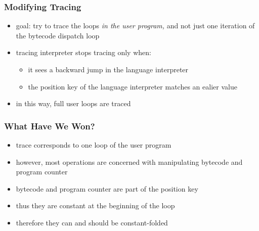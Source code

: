 \documentclass[utf8x]{beamer}
\begin{document}
\begin{frame}
    \frametitle{Modifying Tracing}
    \begin{itemize}
    \item goal: try to trace the loops \emph{in the user program,}
          and not just one iteration of the bytecode dispatch loop
    \item tracing interpreter stops tracing only when:
        \begin{itemize}
        \item it sees a backward jump in the language interpreter
        \item the position key of the language interpreter matches an ealier value
        \end{itemize}
    \item in this way, full user loops are traced
    \end{itemize}
\end{frame}

\begin{frame}
    \frametitle{What Have We Won?}
    \begin{itemize}
    \item trace corresponds to one loop of the user program
    \item however, most operations are concerned with manipulating bytecode and program counter
    \item bytecode and program counter are part of the position key
    \item thus they are constant at the beginning of the loop
    \item therefore they can and should be constant-folded
    \end{itemize}
\end{frame}
\end{document}
